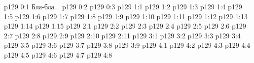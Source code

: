\author{Промежуточные создания}
\vs p129 0:1  Бла-бла...
\vs p129 0:2 
\vs p129 0:3 
\vs p129 1:1 
\vs p129 1:2 
\vs p129 1:3 
\vs p129 1:4 
\vs p129 1:5 
\vs p129 1:6 \pc 
\vs p129 1:7 \pc 
\vs p129 1:8 
\vs p129 1:9 
\vs p129 1:10 
\vs p129 1:11 
\vs p129 1:12 
\vs p129 1:13 
\vs p129 1:14 \pc 
\vs p129 1:15 
\vs p129 2:1 
\vs p129 2:2 
\vs p129 2:3 \pc 
\vs p129 2:4 
\vs p129 2:5 \pc 
\vs p129 2:6 \pc 
\vs p129 2:7 
\vs p129 2:8 
\vs p129 2:9 \pc 
\vs p129 2:10 
\vs p129 2:11 \pc 
{}
\vs p129 3:1 
\vs p129 3:2 \pc 
\vs p129 3:3 
\vs p129 3:4 
\vs p129 3:5 \pc 
\vs p129 3:6 \pc 
\vs p129 3:7 \pc 
\vs p129 3:8 
\vs p129 3:9 
\vs p129 4:1 
\vs p129 4:2 
\vs p129 4:3 
\vs p129 4:4 
\vs p129 4:5 
\vs p129 4:6 
\vs p129 4:7 
\vs p129 4:8 \pc 
\quizlink

